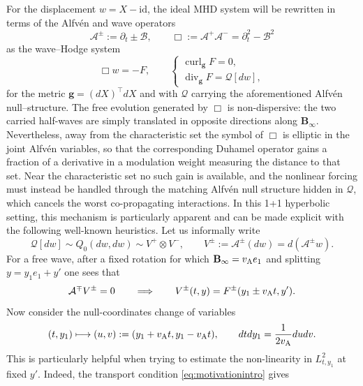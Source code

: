 \documentclass[11pt,reqno]{amsart}
\theoremstyle{plain}
\theoremstyle{definition}
\theoremstyle{remark}
\numberwithin{equation}{section}
\DeclareMathOperator{\Div}{div}
\DeclareMathOperator{\curl}{curl}
\newcommand{\gmetric}{\mathbf g}
\newcommand{\Binf}{\mathbf B_\infty}
\begin{document}
For the displacement $w=X-\mathrm{id}$, the ideal MHD system will be
rewritten in terms of the Alfv\'en and wave operators
\[
 \mathcal A^\pm:=\partial_t\pm\mathcal B,
 \qquad
 \Box:=\mathcal A^+\mathcal A^-
      =\partial_t^2-\mathcal B^2
\]
as the wave--Hodge system
\begin{equation}\label{eq:WaveHodgeliterature}
 \Box w=-F,\qquad
    \begin{cases}
        \curl_{\gmetric}F=0,\\
        \Div_{\gmetric}F=\mathcal Q[dw],
    \end{cases}
\end{equation}
for the metric $\gmetric=(dX)^{\top}dX$ and with $\mathcal{Q}$ carrying the
aforementioned Alfv\'en null--structure. The free evolution generated by $\Box$ is
non-dispersive: the two carried
half-waves are simply translated in opposite directions along $\Binf$.
Nevertheless, away from the characteristic set the symbol of $\Box$ is
elliptic in the joint Alfv\'en variables, so that the corresponding Duhamel
operator gains a fraction of a derivative in a modulation weight measuring
the distance to that set. Near the characteristic set no such gain is
available, and the nonlinear forcing must instead be handled through the
matching Alfv\'en null structure hidden in $\mathcal{Q}$, which cancels the worst
co-propagating interactions.  In this 1+1 hyperbolic setting, this mechanism is particularly apparent and can be made explicit with the following well-known heuristics. Let us informally write 
\[
 \mathcal Q[dw]\sim Q_0(dw,dw)\sim V^+\otimes V^-,
 \qquad
 V^\pm:=\mathcal A^\pm(dw)=d(\mathcal A^\pm w).
\]
For a free wave, after a fixed rotation for which $\Binf=v_{\rm A}e_1$ and splitting $y=y_1e_1+y'$ one sees that
\begin{equation}\label{eq:motivationintro}
 \mathcal A^\mp V^\pm=0
 \qquad\Longrightarrow\qquad
 V^\pm(t,y)=F^\pm(y_1\pm v_{\rm A}t,y').
\end{equation}
Now consider the null-coordinates change of variables
\[
 (t,y_1)\longmapsto(u,v):=(y_1+v_{\rm A}t,y_1-v_{\rm A}t),
 \qquad
 dtdy_1=\frac1{2v_{\rm A}}dudv.
\]
This is particularly helpful when trying to estimate the non-linearity in $L^2_{t,y_1}$ at fixed $y'$. Indeed, the transport condition \eqref{eq:motivationintro} gives
\end{document}
